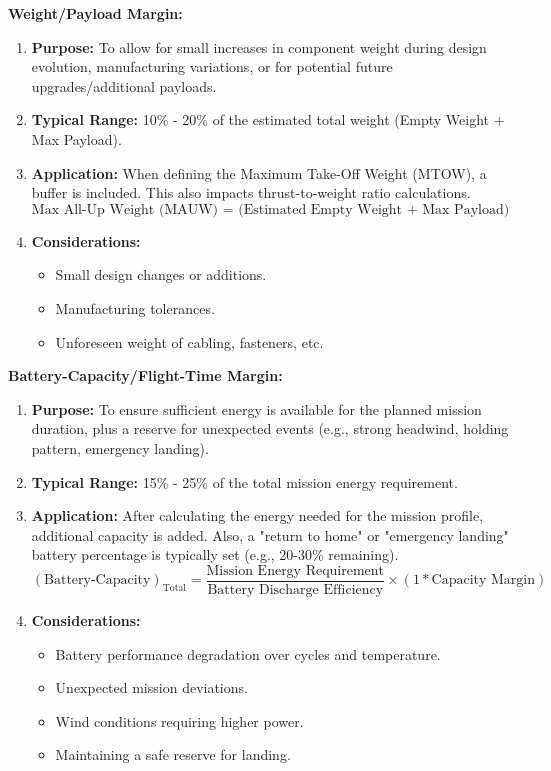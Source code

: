 \documentclass[12pt]{report}
\begin{document}
        \noindent \textbf{\large Weight/Payload Margin:} \\
        \begin{enumerate}
          \item \textbf{Purpose:} To allow for small increases in component weight during design evolution, manufacturing variations, or for potential future upgrades/additional payloads.
          \item \textbf{Typical Range:} 10\% - 20\% of the estimated total weight (Empty Weight + Max Payload).
          \item \textbf{Application:} When defining the Maximum Take-Off Weight (MTOW), a buffer is included. This also impacts thrust-to-weight ratio calculations. \[ \text{Max All-Up Weight (MAUW) = (Estimated Empty Weight + Max Payload) * (1 + Weight Margin)} \]
          \item \textbf{Considerations:}
            \begin{itemize}
              \item Small design changes or additions.
              \item Manufacturing tolerances.
              \item Unforeseen weight of cabling, fasteners, etc.
            \end{itemize}
        \end{enumerate}
        \noindent \textbf{\large Battery-Capacity/Flight-Time Margin:} \\
        \begin{enumerate}
          \item \textbf{Purpose:} To ensure sufficient energy is available for the planned mission duration, plus a reserve for unexpected events (e.g., strong headwind, holding pattern, emergency landing).
          \item \textbf{Typical Range:} 15\% - 25\% of the total mission energy requirement.
          \item \textbf{Application:} After calculating the energy needed for the mission profile, additional capacity is added. Also, a "return to home" or "emergency landing" battery percentage is typically set (e.g., 20-30\% remaining). 
            \[ (\text{Battery-Capacity})_{\text{Total}} = \frac{ \text{Mission Energy Requirement} }{ \text{Battery Discharge Efficiency} } \times (1 * \text{Capacity Margin}) \] 
          \item \textbf{Considerations:}
            \begin{itemize}
              \item Battery performance degradation over cycles and temperature.
              \item Unexpected mission deviations.
              \item Wind conditions requiring higher power.
              \item Maintaining a safe reserve for landing.
            \end{itemize}
        \end{enumerate}
\end{document}
